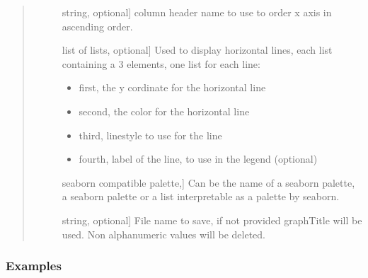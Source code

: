 \documentclass[letterpaper,10pt,english]{sphinxmanual}
\begin{document}
\begin{fulllineitems}
\begin{quote}
\begin{description}
\begin{description}
\item[{}] \leavevmode{[}string, optional{]}
 column header name to use 
to order x axis in ascending order.

\item[{}] \leavevmode{[}list of lists, optional{]}
Used to display horizontal lines, 
each list containing a 3 elements, one list for each line:
\begin{itemize}
\item {} 
first, the y cordinate for the horizontal line

\item {} 
second, the color for the horizontal line

\item {} 
third, linestyle to use for the line

\item {} 
fourth, label of the line, to use in the legend (optional)

\end{itemize}

\item[{}] \leavevmode{[}seaborn compatible palette,{]}
Can be the name of a seaborn palette, 
a seaborn palette or a list 
interpretable as a palette by seaborn.

\item[{}] \leavevmode{[}string, optional{]}
File name to save, if not provided graphTitle will be used. 
Non alphanumeric values will be deleted.

\end{description}

\end{description}\end{quote}
\subsubsection*{Examples}


\end{fulllineitems}
\end{document}
